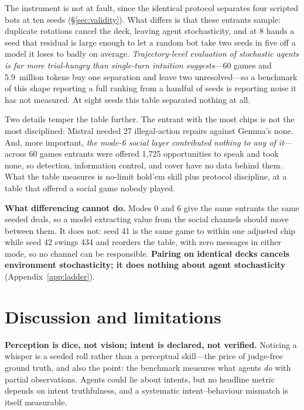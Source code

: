\documentclass{article}
\begin{document}
The instrument is not at fault, since the identical protocol separates four
scripted bots at ten seeds (\S\ref{sec:validity}). What differs is that
these entrants sample: duplicate rotations cancel the deck, leaving agent
stochasticity, and at 8 hands a seed that residual is large enough to let a
random bot take two seeds in five off a model it loses to badly on average.
\emph{Trajectory-level evaluation of stochastic agents is far more
trial-hungry than single-turn intuition suggests}---60 games and
5.9~million tokens buy one separation and leave two unresolved---so a
benchmark of this shape reporting a full ranking from a handful of seeds is
reporting noise it has not measured. At eight seeds this table separated
nothing at all.

Two details temper the table further. The entrant with the most chips is
not the most disciplined: Mistral needed 27 illegal-action repairs against
Gemma's none. And, more important, \emph{the mode-6 social layer
contributed nothing to any of it}---across 60 games entrants were offered
1{,}725 opportunities to speak and took none, so detection, information
control, and cover have no data behind them. What the table measures is
no-limit hold'em skill plus protocol discipline, at a table that offered a
social game nobody played.

\textbf{What differencing cannot do.} Modes 0 and 6 give the same entrants
the same seeded deals, so a model extracting value from the social channels
should move between them. It does not: seed 41 is the same game to within
one adjusted chip while seed 42 swings 434 and reorders the table, with zero
messages in either mode, so no channel can be responsible.
\textbf{Pairing on identical decks cancels environment stochasticity; it does
nothing about agent stochasticity} (Appendix~\ref{app:ladder}).

\section{Discussion and limitations}
\label{sec:limits}

\textbf{Perception is dice, not vision; intent is declared, not verified.}
Noticing a whisper is a seeded roll rather than a perceptual skill---the
price of judge-free ground truth, and also the point: the benchmark measures
what agents \emph{do} with partial observations. Agents could lie about
intents, but no headline metric depends on intent truthfulness, and a
systematic intent--behaviour mismatch is itself measurable.
\end{document}
